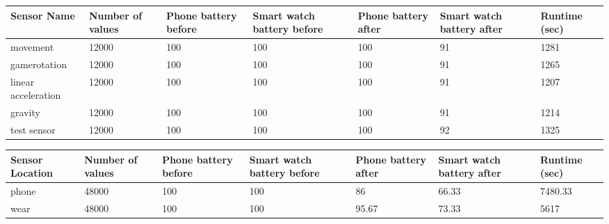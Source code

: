 \begin{center}
  \begin{tabular}{ |p{3cm}|p{1.5cm}|p{1.5cm}|p{1.5cm}|p{1.5cm}|p{1.5cm}|p{1.5cm}|}
  \hline
Sensor Name &Number of values &	Phone battery before &	Smart watch battery before &	Phone battery after	& Smart watch battery after &	Runtime (sec) \\
  \hline
movement 	& 	12000	& 100	& 100	& 100	& 91	& 1281 \\
gamerotation	 & 12000	 & 100	& 100	& 100	& 91	& 1265 \\
linear acceleration 	&  12000 & 	100	& 100	& 100	& 91	& 1207\\ 
gravity 	&		12000	& 100	& 100	& 100	& 91	& 1214 \\
test sensor & 	 12000	& 100	& 100	& 100	& 92	& 1325\\
  \hline
  \end{tabular}
             \label{tab:title6} 
\end{center}

\begin{center}
  \begin{tabular}{ |p{3cm}|p{1.5cm}|p{1.5cm}|p{1.5cm}|p{1.5cm}|p{1.5cm}|p{1.5cm}|}
  \hline
Sensor Location &Number of values &	Phone battery before &	Smart watch battery before &	Phone battery after	& Smart watch battery after &	Runtime (sec) \\
  \hline
phone	&  48000 &	100	& 100	& 86	& 66.33	& 7480.33 \\
wear	 & 48000	 &100	&100	&95.67	&73.33 &	5617 \\
  \hline
  \end{tabular}
    \label{tab:title7} 
\end{center}



